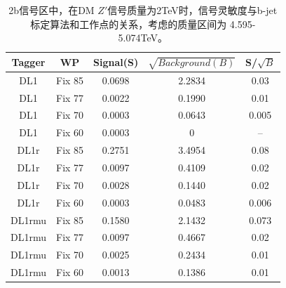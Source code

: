 \begin{table}[ht]
	\begin{center}
		\begin{tabular}{|c|c|c|c|c|}\hline
			Tagger       & WP          & Signal(S)    & $\sqrt{Background(B)}$    & S/$\sqrt{B}$ \\
			\hline
			DL1          & Fix 85      & 0.0698      & 2.2834         & 0.03        \\
			DL1          & Fix 77      & 0.0022      & 0.1990         & 0.01        \\
			DL1          & Fix 70      & 0.0003      & 0.0643         & 0.005        \\
			DL1          & Fix 60      & 0.0003      & 0              & --           \\
			\hline
			DL1r          & Fix 85      & 0.2751       & 3.4954        & 0.08        \\
			DL1r          & Fix 77      & 0.0097       & 0.4109        & 0.02        \\
			DL1r          & Fix 70      & 0.0028       & 0.1440        & 0.02        \\
			DL1r          & Fix 60      & 0.0003       & 0.0483        & 0.006        \\
			\hline
			DL1rmu          & Fix 85      & 0.1580     & 2.1432       & 0.073        \\
			DL1rmu          & Fix 77      & 0.0097     & 0.4667       & 0.02        \\
			DL1rmu          & Fix 70      & 0.0025     & 0.2434       & 0.01        \\
			DL1rmu          & Fix 60      & 0.0013     & 0.1386       & 0.01        \\
			\hline
		\end{tabular}
	\end{center}
	\caption{
	2b信号区中，在DM $Z\prime$信号质量为2TeV时，信号灵敏度与b-jet标定算法和工作点的关系，考虑的质量区间为 4.595-5.074TeV。
	}
	\label{tab:SenZ5TeV}
\end{table}


